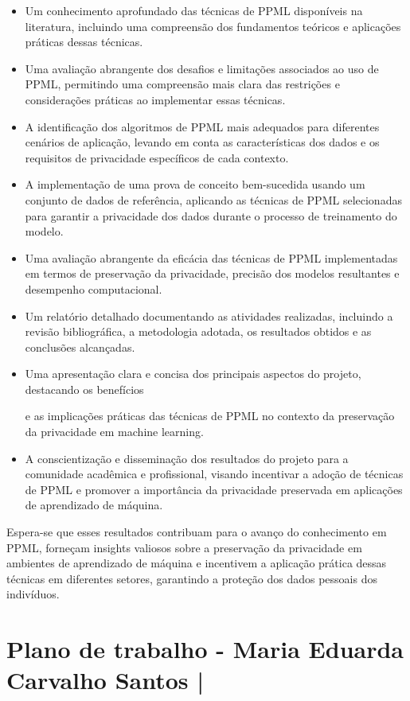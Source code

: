 \documentclass{article}
\begin{document}
\begin{itemize}
\item Um conhecimento aprofundado das técnicas de PPML disponíveis na literatura, incluindo uma compreensão dos fundamentos teóricos e aplicações práticas dessas técnicas.
\item Uma avaliação abrangente dos desafios e limitações associados ao uso de PPML, permitindo uma compreensão mais clara das restrições e considerações práticas ao implementar essas técnicas.
\item A identificação dos algoritmos de PPML mais adequados para diferentes cenários de aplicação, levando em conta as características dos dados e os requisitos de privacidade específicos de cada contexto.
\item A implementação de uma prova de conceito bem-sucedida usando um conjunto de dados de referência, aplicando as técnicas de PPML selecionadas para garantir a privacidade dos dados durante o processo de treinamento do modelo.
\item Uma avaliação abrangente da eficácia das técnicas de PPML implementadas em termos de preservação da privacidade, precisão dos modelos resultantes e desempenho computacional.
\item Um relatório detalhado documentando as atividades realizadas, incluindo a revisão bibliográfica, a metodologia adotada, os resultados obtidos e as conclusões alcançadas.
\item Uma apresentação clara e concisa dos principais aspectos do projeto, destacando os benefícios

e as implicações práticas das técnicas de PPML no contexto da preservação da privacidade em machine learning.
\item A conscientização e disseminação dos resultados do projeto para a comunidade acadêmica e profissional, visando incentivar a adoção de técnicas de PPML e promover a importância da privacidade preservada em aplicações de aprendizado de máquina.
\end{itemize}

Espera-se que esses resultados contribuam para o avanço do conhecimento em PPML, forneçam insights valiosos sobre a preservação da privacidade em ambientes de aprendizado de máquina e incentivem a aplicação prática dessas técnicas em diferentes setores, garantindo a proteção dos dados pessoais dos indivíduos.

\section{Plano de trabalho - Maria Eduarda Carvalho Santos | }
\end{document}
